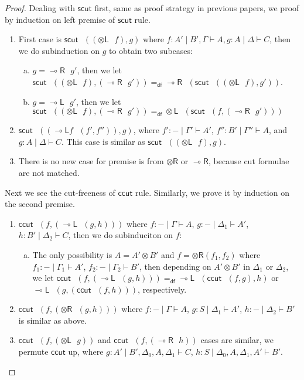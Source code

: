 \documentclass[submission,copyright,creativecommons]{eptcs}
\theoremstyle{definition}
\newcommand{\tl}{\otimes \mathsf{L}}
\newcommand{\tr}{\otimes \mathsf{R}}
\newcommand{\lright}{{\multimap}\mathsf{R}}
\newcommand{\lleft}{{\multimap}\mathsf{L}}
\newcommand{\ot}{\otimes}
\newcommand{\defeq}{=_{\mathsf{df}}}
\begin{document}
\begin{proof}
  Dealing with $\mathsf{scut}$ first, same as proof strategy in previous papers, we proof by induction on left premise of $\mathsf{scut}$ rule.
  \begin{enumerate}[1. ]
    \item First case is $\mathsf{scut} \text{ } ((\tl \text{ } f), g)$ where $f : A' \mid B' , \Gamma \vdash A, g : A \mid \Delta \vdash C$, then we do subinduction on $g$ to obtain two subcases:
          \begin{enumerate}[a. ]
            \item $g = \lright \text{ } g'$, then we let $\mathsf{scut} \text{ } ((\tl \text{ } f), (\lright \text{ } g')) \defeq \lright \text{ } (\mathsf{scut} \text{ } ((\tl \text{ } f), g'))$.
            \item $g = \lleft \text{ } g'$, then we let $\mathsf{scut} \text{ } ((\tl \text{ } f), (\lright \text{ } g')) \defeq \tl \text{ } (\mathsf{scut} \text{ } (f, (\lright \text{ } g')))$
          \end{enumerate}
    \item $\mathsf{scut} \text{ } ((\lleft f \text{ } (f' , f'')), g)$, where $f' : - \mid \Gamma' \vdash A'$, $f'' : B' \mid \Gamma'' \vdash A$, and $g : A \mid \Delta \vdash C$.
    This case is similar as $\mathsf{scut} \text{ } ((\tl \text{ } f), g)$.
    \item There is no new case for premise is from $\tr$ or $\lright$, because cut formulae are not matched.
  \end{enumerate}
  Next we see the cut-freeness of $\mathsf{ccut}$ rule.
  Similarly, we prove it by induction on the second premise.
  \begin{enumerate}[1. ]
    \item $\mathsf{ccut} \text{ } (f , (\lleft \text{ } (g, h)))$ where $f : - \mid \Gamma \vdash A$, $g : - \mid \Delta_1 \vdash A'$, $h : B' \mid \Delta_2 \vdash C$, then we do subinduciton on $f$:
    \begin{enumerate}[a. ]
      \item The only possibility is $A = A' \ot B'$ and $f = \tr (f_1, f_2)$ where $f_1 : - \mid \Gamma_1 \vdash A'$, $f_2 : - \mid \Gamma_2 \vdash B'$, then depending on $A' \ot B'$ in $\Delta_1$ or $\Delta_2$,
      we let $\mathsf{ccut} \text{ } (f , (\lleft \text{ } (g, h))) \defeq \lleft \text{ } (\mathsf{ccut} \text{ } (f, g), h)$ or $ \lleft \text{ } (g, (\mathsf{ccut} \text{ } (f, h)))$, respectively.
    \end{enumerate}
    \item $\mathsf{ccut} \text{ } (f , (\tr \text{ } (g, h)))$ where $f : - \mid \Gamma \vdash A$, $g : S \mid \Delta_1 \vdash A'$, $h : - \mid \Delta_2 \vdash B'$ is similar as above.
    \item $\mathsf{ccut} \text{ } (f, (\tl \text{ } g))$ and
    $\mathsf{ccut} \text{ } (f, (\lright \text{ } h))$ cases are similar, we permute $\mathsf{ccut}$ up,
    where $g : A' \mid B' , \Delta_0 , A , \Delta_1 \vdash C$, $h : S \mid \Delta_0 , A , \Delta_1 , A' \vdash B'$.
  \end{enumerate}
\end{proof}
\end{document}
